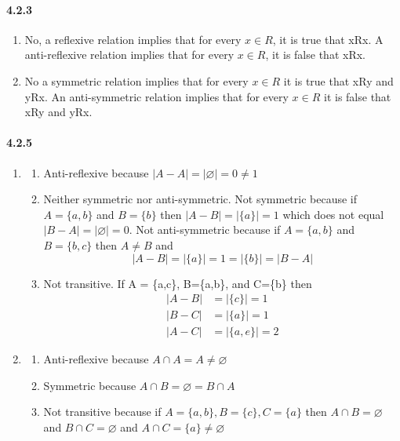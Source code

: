 \documentclass[11pt, letterpaper, twocolumn, fleqn]{article}
\let\emptyset\varnothing
\begin{document}
    \paragraph{4.2.3}
        \begin{enumerate}
            \item No, a reflexive relation implies that for every $x \in R$, it is true that xRx. A anti-reflexive relation implies that for every $x \in R$, it is false that xRx.
            \item No a symmetric relation implies that for every $x \in R$ it is true that xRy and yRx. An anti-symmetric relation implies that for every $x \in R$ it is false that xRy and yRx.
        \end{enumerate}
    
    \paragraph{4.2.5}
        \begin{enumerate}
            \item 
                \begin{enumerate}
                    \item Anti-reflexive because $|A-A| = |\emptyset| = 0 \neq 1$ 
                    \item Neither symmetric nor anti-symmetric. Not symmetric because if $A=\{a,b\}$ and $B=\{b\}$ then $|A-B| = |\{a\}| = 1$ which does not equal $|B-A| = |\emptyset| = 0$. Not anti-symmetric because if $A=\{a,b\}$ and $B=\{b,c\}$ then $A \neq B$ and 
                        $$|A-B| = |\{a\}| = 1 = |\{b\}| = |B-A|$$
                    \item Not transitive. If A = \{a,c\}, B=\{a,b\}, and C=\{b\} then 
                    \begin{align*}
                        |A-B| &= |\{c\}| = 1 \\
                        |B-C| &= |\{a\}| = 1 \\
                        |A-C| &= |\{a,e\}| = 2
                    \end{align*}
                \end{enumerate}
            \item
                \begin{enumerate}
                    \item Anti-reflexive because $A \cap A = A \neq \emptyset$
                    \item Symmetric because $A \cap B = \emptyset = B \cap A$
                    \item Not transitive because if $A = \{a,b\}, B=\{c\}, C=\{a\}$ then $A \cap B = \emptyset$ and $B \cap C = \emptyset$ and $A \cap C = \{a\} \neq \emptyset$
                \end{enumerate}
        \end{enumerate}
    
\end{document}
